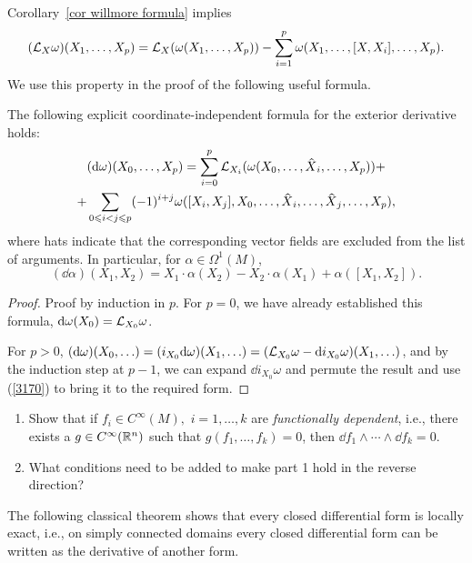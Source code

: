 Corollary~\ref{cor willmore formula} implies
\[(\mathcal{L}_X\omega) (X_1,\ldots,X_p)=\mathcal{L}_X(\omega(X_1,\ldots,X_p))-\sum_{i=1}^p\omega(X_1,\ldots,[X,X_i],\ldots,X_p).\label{3170}\]
We use this property in the proof of the following useful formula.

\begin{prop}[{{\cite[Prop.~4.1.6]{RS1}}}]\label{prop 4.1.6 RS1}
    The following explicit coordinate-independent formula for the exterior derivative holds:
    \begin{multline}
        (\dd\omega)(X_0,\ldots,X_{p})=\sum_{i=0}^p \Lie_{X_i}(\omega(X_0,\ldots,\wh{X}_i,\ldots,X_p))+\\+\sum_{0\leq i<j\leq p}(-1)^{i+j}\omega([X_i,X_j],X_0,\ldots,\wh{X}_i,\ldots,\wh{X}_j,\ldots,X_p),
    \end{multline}
    where hats indicate that the corresponding vector fields are excluded from the list of arguments. In particular, for $\alpha\in\Omega^1(M)$,
    \[(\dd\alpha)(X_1,X_2)=X_1\cdot \alpha(X_2)-X_2\cdot\alpha(X_1)+\alpha ([X_1,X_2]).\label{eq prop 4.1.6}\]
\end{prop}
\begin{proof}
Proof by induction in $p$. For $p=0$, we have already established this formula, ${\mathrm{d}} \omega(X_0)=\mathcal{L}_{X_0}\omega$.

For $p>0$, $({\mathrm{d}}\omega)(X_0,\ldots )=(i_{X_0}{\mathrm{d}}\omega)(X_1,\ldots)=(\mathcal{L}_{X_0}\omega-{\mathrm{d}} i_{X_0}\omega)(X_1,\ldots)$, and by the induction step at $p-1$, we can expand $\dd i_{X_0}\omega$ and permute the result and use (\ref{3170}) to bring it to the required form.
\end{proof}

\begin{xca}
    \begin{enumerate}
        \item Show that if $f_i\in C^\infty(M),$ $i=1,\ldots,k$ are \emph{functionally dependent}, i.e., there exists a $g\in C^\infty(\mathbb{R}^n)$ such that $g(f_1,\ldots,f_k)=0$, then $\dd f_1\wedge\cdots\wedge \dd f_k=0$.
        \item What conditions need to be added to make part 1 hold in the reverse direction?
    \end{enumerate}
\end{xca}

The following classical theorem shows that every closed differential form is locally exact, i.e., on simply connected domains every closed differential form can be written as the derivative of another form.


